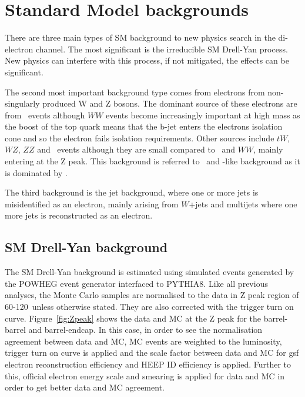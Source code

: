 \clearpage
\section{Standard Model backgrounds}
There are three main types of SM background to new physics search in the di-electron channel. The most significant is the irreducible SM Drell-Yan process. New physics can interfere with this process, if not mitigated, the effects can be significant.

The second most important background type comes from electrons from non-singularly produced W and Z bosons. The dominant source of these electrons are from \ttbar\ events although $WW$ events become increasingly important at high mass as the boost of the top quark means that the b-jet enters the electrons isolation cone and so the electron fails isolation requirements. Other sources include $tW$, $WZ$, $ZZ$ and \ztt\ events although they are small compared to \ttbar\ and $WW$, mainly entering at the Z peak. This background is referred to \ttbar\ and \ttbar-like background as it is dominated by \ttbar.

The third background is the jet background, where one or more jets is misidentified as an electron, mainly arising from $W$+jets and multijets where one more jets is reconstructed as an electron.

\subsection{SM Drell-Yan background}

The SM Drell-Yan background is estimated using simulated events generated by the POWHEG event generator interfaced to PYTHIA8.
Like all previous analyses, the Monte Carlo samples are normalised to the data in Z peak region of 60-120~\GeVCSq unless otherwise stated. They are also corrected with the trigger turn on curve.
Figure~\ref{fig:Zpeak} shows the data and MC at the Z peak for the barrel-barrel and barrel-endcap. In this case, in order to see the normalisation agreement between data and MC, MC events are weighted to the luminosity, trigger turn on curve is applied and the scale factor between data and MC for gsf electron reconstruction efficiency and HEEP ID efficiency is applied. Further to this, official electron energy scale and smearing is applied for data and MC in order to get better data and MC agreement.


